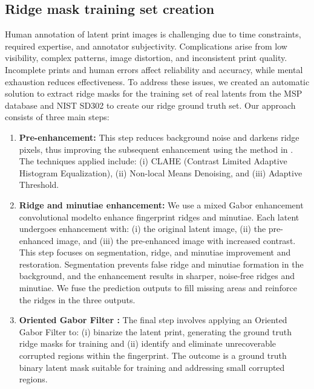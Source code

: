 \documentclass[twocolumn, switch]{article} %
\begin{document}
\subsection{Ridge mask training set creation}
\label{trainin1}

Human annotation of latent print images is challenging due to time constraints, required expertise, and annotator subjectivity. Complications arise from low visibility, complex patterns, image distortion, and inconsistent print quality. Incomplete prints and human errors affect reliability and accuracy, while mental exhaustion reduces effectiveness. To address these issues, we created an automatic solution to extract ridge masks for the training set of real latents from the MSP database and NIST SD302 to create our ridge ground truth set. Our approach consists of three main steps:

\begin{enumerate}[noitemsep]
\item \textbf{Pre-enhancement:} This step reduces background noise and darkens ridge pixels, thus improving the subsequent enhancement using the method in \cite{tang2017FingerNet}. The techniques applied include: (i) CLAHE (Contrast Limited Adaptive Histogram Equalization), (ii) Non-local Means Denoising, and (iii) Adaptive Threshold.
\item \textbf{Ridge and minutiae enhancement:} We use a mixed Gabor enhancement convolutional model\footnotemark to enhance fingerprint ridges and minutiae. Each latent undergoes enhancement with: (i) the original latent image, (ii) the pre-enhanced image, and (iii) the pre-enhanced image with increased contrast. This step focuses on segmentation, ridge, and minutiae improvement and restoration. Segmentation prevents false ridge and minutiae formation in the background, and the enhancement results in sharper, noise-free ridges and minutiae. We fuse the prediction outputs to fill missing areas and reinforce the ridges in the three outputs.
\item \textbf{Oriented Gabor Filter \cite{hong1998fingerprint}:} The final step involves applying an Oriented Gabor Filter to: (i) binarize the latent print, generating the ground truth ridge masks for training and (ii) identify and eliminate unrecoverable corrupted regions within the fingerprint. The outcome is a ground truth binary latent mask suitable for training and addressing small corrupted regions.
\end{enumerate}

\end{document}
